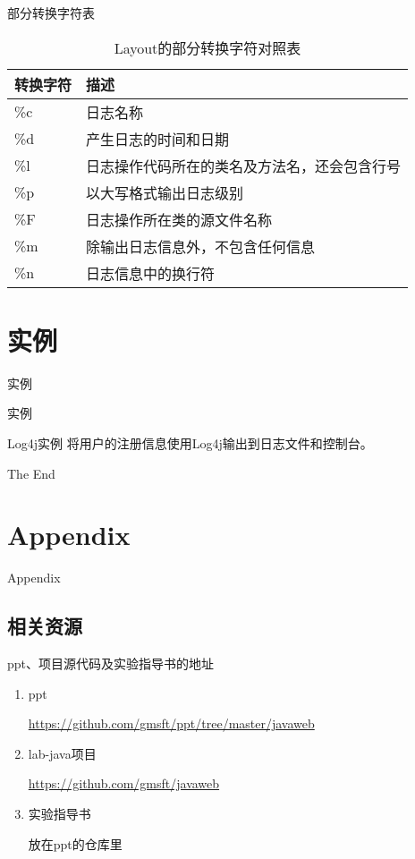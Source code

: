 \documentclass{beamer}
\begin{document}
\begin{frame}{部分转换字符表}
\begin{table}
\begin{tabular}{ll}
\toprule
\textbf{转换字符}&\textbf{描述}\\
\midrule
\%c&日志名称\\
\%d&产生日志的时间和日期\\
\%l&日志操作代码所在的类名及方法名，还会包含行号\\
\%p&以大写格式输出日志级别\\
\%F&日志操作所在类的源文件名称\\
\%m&除输出日志信息外，不包含任何信息\\
\%n&日志信息中的换行符\\
\bottomrule
\end{tabular}
\caption{Layout的部分转换字符对照表}
\end{table}
\end{frame}
\section{实例}
\begin{frame}
\Huge{\centerline{实例}}
\end{frame}
\begin{frame}{实例}
\end{frame}
\begin{frame}{Log4j实例}
将用户的注册信息使用Log4j输出到日志文件和控制台。
\end{frame}


\begin{frame}
\Huge{\centerline{The End}}
\end{frame}

\section{Appendix}

\begin{frame}
\Huge{\centerline{Appendix}}
\end{frame}

\subsection{相关资源}
\begin{frame}
\begin{block}{ppt、项目源代码及实验指导书的地址}
\begin{enumerate}
\item
ppt

\url{https://github.com/gmsft/ppt/tree/master/javaweb}
\item
lab-java项目

\url{https://github.com/gmsft/javaweb}

\item
实验指导书

放在ppt的仓库里
\end{enumerate}
\end{block}
\end{frame}



\end{document}
